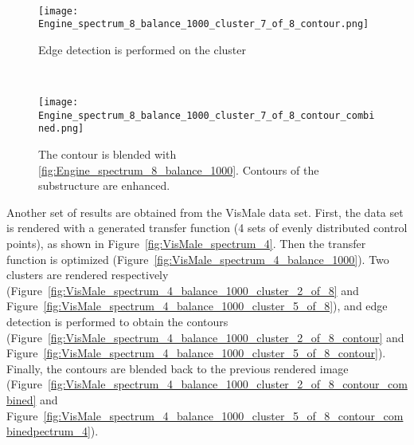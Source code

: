\begin{figure}
\begin{minipage}{.24\textwidth}
		\label{fig:Engine_spectrum_8_balance_1000_cluster_7_of_8}
	\end{minipage}~
	\begin{minipage}{.24\textwidth}
		\centering
		\texttt{[image: Engine\_spectrum\_8\_balance\_1000\_cluster\_7\_of\_8\_contour.png]}
		\caption{Edge detection is performed on the cluster}
		\label{fig:Engine_spectrum_8_balance_1000_cluster_7_of_8_contour}
	\end{minipage}~
	\begin{minipage}{.24\textwidth}
		\centering
		\texttt{[image: Engine\_spectrum\_8\_balance\_1000\_cluster\_7\_of\_8\_contour\_combined.png]}
		\caption{The contour is blended with \ref{fig:Engine_spectrum_8_balance_1000}. Contours of the substructure are enhanced.}
		\label{fig:Engine_spectrum_8_balance_1000_cluster_7_of_8_contour_combined}
	\end{minipage}
\end{figure}

Another set of results are obtained from the VisMale data set. First, the data set is rendered with a generated transfer function (4 sets of evenly distributed control points), as shown in Figure~\ref{fig:VisMale_spectrum_4}. Then the transfer function is optimized (Figure~\ref{fig:VisMale_spectrum_4_balance_1000}). Two clusters are rendered respectively (Figure~\ref{fig:VisMale_spectrum_4_balance_1000_cluster_2_of_8} and Figure~\ref{fig:VisMale_spectrum_4_balance_1000_cluster_5_of_8}), and edge detection is performed to obtain the contours (Figure~\ref{fig:VisMale_spectrum_4_balance_1000_cluster_2_of_8_contour} and Figure~\ref{fig:VisMale_spectrum_4_balance_1000_cluster_5_of_8_contour}). Finally, the contours are blended back to the previous rendered image (Figure~\ref{fig:VisMale_spectrum_4_balance_1000_cluster_2_of_8_contour_combined} and Figure~\ref{fig:VisMale_spectrum_4_balance_1000_cluster_5_of_8_contour_combinedpectrum_4}).

\pagebreak

